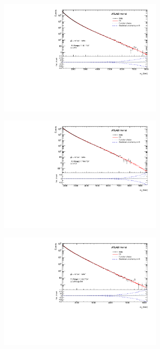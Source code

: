 \begin{figure}[!thbp]
  \begin{subfigure}{.5\textwidth}
  \centering
  \includegraphics[width=0.9\textwidth]{figuresDijet/07-SystematicUncertainties/uncertQ1.pdf}
  \caption{}
  \end{subfigure}
  \begin{subfigure}{.5\textwidth}
  \centering
  \includegraphics[width=0.9\textwidth]{figuresDijet/07-SystematicUncertainties/uncertWstar.pdf}
  \caption{}
  \end{subfigure}
\newline 
  \begin{subfigure}{.5\textwidth}
  \centering
  \includegraphics[width=0.9\textwidth]{figuresDijet/07-SystematicUncertainties/uncertmbj.pdf}

\end{subfigure}
\end{figure}
